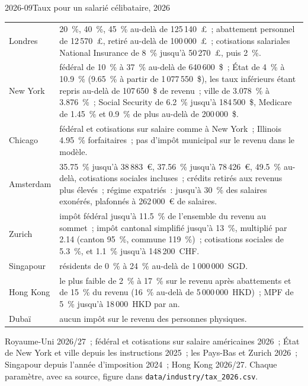 \begin{dated}{2026-09}{Taux pour un salarié célibataire, 2026}\label{dat:in:pay-regulation-and-tax-by-location:rates}
\footnotesize
\begin{tabular}{@{}p{2.2cm}p{10.4cm}@{}}
\toprule
Londres & 20~\%, 40~\%, 45~\% au-delà de 125\,140~\pounds{}~; abattement personnel de 12\,570~\pounds{}, retiré au-delà de 100\,000~\pounds{}~; cotisations
salariales National Insurance de 8~\% jusqu'à 50\,270~\pounds{}, puis 2~\%.\\
New York & fédéral de 10~\% à 37~\% au-delà de 640\,600~\$~; État de 4~\% à 10.9~\% (9.65~\% à partir de 1\,077\,550~\$), les taux inférieurs
étant repris au-delà de 107\,650~\$ de revenu~; ville de 3.078~\% à 3.876~\%~; Social Security de 6.2~\% jusqu'à 184\,500~\$, Medicare de 1.45~\% et
0.9~\% de plus au-delà de 200\,000~\$.\\
Chicago & fédéral et cotisations sur salaire comme à New York~; Illinois 4.95~\% forfaitaires~; pas d'impôt municipal sur le revenu dans le modèle.\\
Amsterdam & 35.75~\% jusqu'à 38\,883~\euro{}, 37.56~\% jusqu'à 78\,426~\euro{}, 49.5~\% au-delà, cotisations sociales incluses~; crédits
retirés aux revenus plus élevés~; régime expatriés~: jusqu'à 30~\% des salaires exonérés, plafonnés à 262\,000~\euro{} de salaires.\\
Zurich & impôt fédéral jusqu'à 11.5~\% de l'ensemble du revenu au sommet~; impôt cantonal simplifié jusqu'à 13~\%, multiplié par 2.14 (canton 95~\%,
commune 119~\%)~; cotisations sociales de 5.3~\%, et 1.1~\% jusqu'à 148\,200~CHF.\\
Singapour & résidents de 0~\% à 24~\% au-delà de 1\,000\,000~SGD.\\
Hong Kong & le plus faible de 2~\% à 17~\% sur le revenu après abattements et de 15~\% du revenu (16~\% au-delà de 5\,000\,000~HKD)~;
MPF de 5~\% jusqu'à 18\,000~HKD par an.\\
Dubaï & aucun impôt sur le revenu des personnes physiques.\\
\bottomrule
\end{tabular}

\smallskip\noindent Royaume-Uni 2026/27~; fédéral et cotisations sur salaire américaines 2026~; État de New York et ville depuis les instructions 2025~; les
Pays-Bas et Zurich 2026~; Singapour depuis l'année d'imposition 2024~; Hong Kong 2026/27. Chaque paramètre, avec sa source, figure dans
\texttt{data/industry/tax\_2026.csv}.
\end{dated}

